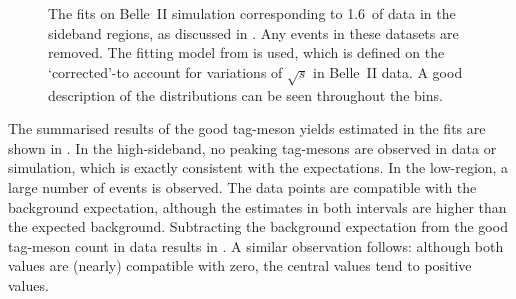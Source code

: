 \begin{figure}[htbp!]
    \centering
    \caption{\label{fig:sideband_mc_fit}    
    The \Mbc fits on Belle~II simulation corresponding to 1.6~\invab of data in the \EB sideband regions,
    as discussed in .
    Any \BtoXsgamma events in these datasets are removed.
    The fitting model from  is used,
    which is defined on the `corrected'-\Mbc to account for variations of $\sqrt{s}$ in Belle~II data.
    A good description of the \Mbc distributions can be seen throughout the \EB bins.
    }
\end{figure}

The summarised results of the good tag-\B meson yields estimated in the \Mbc fits are shown in .
In the high-\EB sideband, no peaking tag-\B mesons are observed in data or simulation, which is exactly consistent with the expectations.
In the low-\EB region, a large number of events is observed.
The data points are compatible with the background expectation, although the estimates in both intervals are higher than the expected background.
Subtracting the background expectation from the good tag-\B meson count in data results in .
A similar observation follows: although both values are (nearly) compatible with zero,
the central values tend to positive values.

